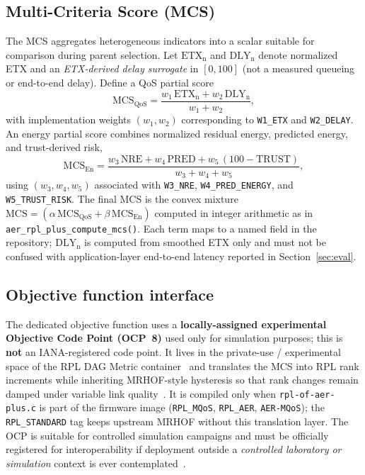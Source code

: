 \subsection{Multi-Criteria Score (MCS)}
The MCS aggregates heterogeneous indicators into a scalar suitable for comparison during parent selection. Let $\mathrm{ETX}_{\mathrm{n}}$ and $\mathrm{DLY}_{\mathrm{n}}$ denote normalized ETX and an \emph{ETX-derived delay surrogate} in $[0,100]$ (not a measured queueing or end-to-end delay). Define a QoS partial score
\[
  \mathrm{MCS}_{\mathrm{QoS}} = \frac{w_1\,\mathrm{ETX}_{\mathrm{n}} + w_2\,\mathrm{DLY}_{\mathrm{n}}}{w_1+w_2},
\]
with implementation weights $(w_1,w_2)$ corresponding to \texttt{W1\_ETX} and \texttt{W2\_DELAY}. An energy partial score combines normalized residual energy, predicted energy, and trust-derived risk,
\[
  \mathrm{MCS}_{\mathrm{En}} = \frac{w_3\,\mathrm{NRE} + w_4\,\mathrm{PRED} + w_5\,(100-\mathrm{TRUST})}{w_3+w_4+w_5},
\]
using $(w_3,w_4,w_5)$ associated with \texttt{W3\_NRE}, \texttt{W4\_PRED\_ENERGY}, and \texttt{W5\_TRUST\_RISK}. The final MCS is the convex mixture $\mathrm{MCS} = (\alpha\,\mathrm{MCS}_{\mathrm{QoS}} + \beta\,\mathrm{MCS}_{\mathrm{En}})$ computed in integer arithmetic as in \texttt{aer\_rpl\_plus\_compute\_mcs()}. Each term maps to a named field in the repository; $\mathrm{DLY}_{\mathrm{n}}$ is computed from smoothed ETX only and must not be confused with application-layer end-to-end latency reported in Section~\ref{sec:eval}.

\subsection{Objective function interface}
The dedicated objective function uses a \textbf{locally-assigned experimental Objective Code Point (OCP~8)} used only for simulation purposes; this is \textbf{not} an IANA-registered code point. It lives in the private-use / experimental space of the RPL DAG Metric container~\cite{rfc6550} and translates the MCS into RPL rank increments while inheriting MRHOF-style hysteresis so that rank changes remain damped under variable link quality~\cite{rfc6719}. It is compiled only when \texttt{rpl-of-aer-plus.c} is part of the firmware image (\texttt{RPL\_MQoS}, \texttt{RPL\_AER}, \texttt{AER-MQoS}); the \texttt{RPL\_STANDARD} tag keeps upstream MRHOF without this translation layer. The OCP is suitable for controlled simulation campaigns and must be officially registered for interoperability if deployment outside a \emph{controlled laboratory or simulation} context is ever contemplated~\cite{rfc6550}.

